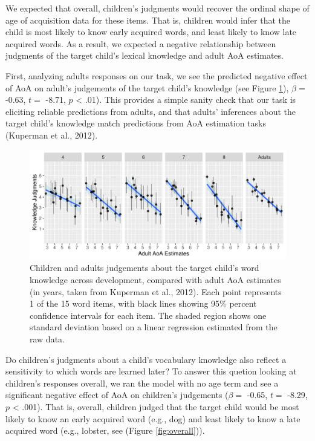 \documentclass[10pt, letterpaper]{article}
\newenvironment{CodeChunk}{}{}
\begin{document}
We expected that overall, children's judgments would recover the ordinal
shape of age of acquisition data for these items. That is, children
would infer that the child is most likely to know early acquired words,
and least likely to know late acquired words. As a result, we expected a
negative relationship between judgments of the target child's lexical
knowledge and adult AoA estimates.

First, analyzing adults responses on our task, we see the predicted
negative effect of AoA on adult's judgements of the target child's
knowledge (see Figure \ref{fig:development}), \(\beta =\) -0.63, \(t =\)
-8.71, \(p\) \textless{} .01). This provides a simple sanity check that
our task is eliciting reliable predictions from adults, and that adults'
inferences about the target child's knowledge match predictions from AoA
estimation tasks (Kuperman et al., 2012).

\begin{CodeChunk}
\begin{figure}[tb]
\includegraphics{figs/development-1} \caption[Children and adults judgements about the target child's word knowledge across development, compared with adult AoA estimates (in years, taken from Kuperman et al., 2012)]{Children and adults judgements about the target child's word knowledge across development, compared with adult AoA estimates (in years, taken from Kuperman et al., 2012). Each point represents 1 of the 15 word items, with black lines showing 95\% percent confidence intervals for each item. The shaded region shows one standard deviation based on a linear regression estimated from the raw data.}\label{fig:development}
\end{figure}
\end{CodeChunk}

Do children's judgments about a child's vocabulary knowledge also
reflect a sensitivity to which words are learned later? To answer this
quetion looking at children's responses overall, we ran the model with
no age term and see a significant negative effect of AoA on children's
judgements (\(\beta =\) -0.65, \(t =\) -8.29, \(p\) \textless{} .001).
That is, overall, children judged that the target child would be most
likely to know an early acquired word (e.g., dog) and least likely to
know a late acquired word (e.g., lobster, see (Figure
\ref{fig:overall})).
\end{document}
